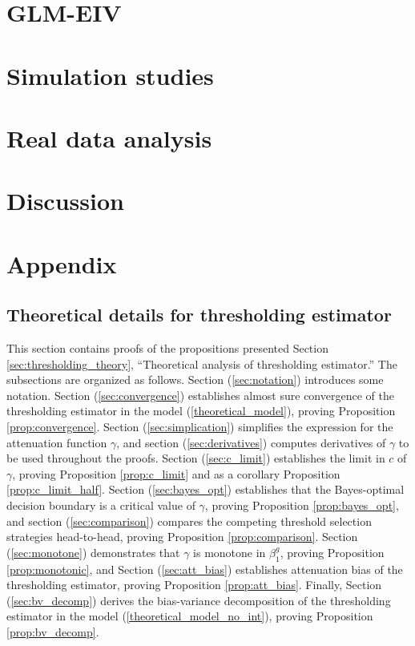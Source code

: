 \documentclass[12pt]{article}
\begin{document}
\section{GLM-EIV}

\section{Simulation studies}

\section{Real data analysis}

\section{Discussion}

\section{Appendix}

\subsection{Theoretical details for thresholding estimator}
This section contains proofs of the propositions presented Section \ref{sec:thresholding_theory}, ``Theoretical analysis of thresholding estimator.'' The subsections are organized as follows. Section (\ref{sec:notation}) introduces some notation. Section (\ref{sec:convergence}) establishes almost sure convergence of the thresholding estimator in the model (\ref{theoretical_model}), proving Proposition \ref{prop:convergence}. Section (\ref{sec:simplication}) simplifies the expression for the attenuation function $\gamma$, and section (\ref{sec:derivatives})  computes derivatives of $\gamma$ to be used throughout the proofs. Section (\ref{sec:c_limit}) establishes the limit in $c$ of $\gamma$, proving Proposition \ref{prop:c_limit} and as a corollary Proposition \ref{prop:c_limit_half}. Section (\ref{sec:bayes_opt}) establishes that the Bayes-optimal decision boundary is a critical value of $\gamma$, proving Proposition \ref{prop:bayes_opt}, and section (\ref{sec:comparison}) compares the competing threshold selection strategies head-to-head, proving Proposition \ref{prop:comparison}. Section (\ref{sec:monotone}) demonstrates that $\gamma$ is monotone in $\beta^g_1$, proving Proposition \ref{prop:monotonic}, and Section (\ref{sec:att_bias}) establishes attenuation bias of the thresholding estimator, proving Proposition \ref{prop:att_bias}. Finally, Section (\ref{sec:bv_decomp}) derives the bias-variance decomposition of the thresholding estimator in the model (\ref{theoretical_model_no_int}), proving Proposition \ref{prop:bv_decomp}.
\end{document}

